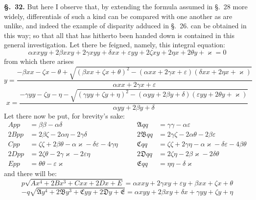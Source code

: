 \documentclass{article}
\begin{document}
\textbf{§.~32.} But here I observe that, by extending the formula assumed in §.~28 more widely,
differentials of such a kind can be compared with one another as are unlike, and indeed the example
of disparity adduced in §.~26. can be obtained in this way; so that all that has hitherto been handed
down is contained in this general investigation. Let there be feigned, namely, this integral
equation:
\[ \alpha xxyy + 2\beta xxy + 2\gamma xyy + \delta xx + \varepsilon yy + 2\zeta xy + 2\eta x + 2\theta y + \varkappa = 0 \tag{1} \]
from which there arises
\[ y = \frac{-\beta xx - \zeta x - \theta + \sqrt{(\beta xx + \zeta x + \theta)^{2} - (\alpha xx + 2\gamma x + \varepsilon)(\delta xx + 2\eta x + \varkappa)}}{\alpha xx + 2\gamma x + \varepsilon} \tag{2} \]
\[ x = \frac{-\gamma yy - \zeta y - \eta - \sqrt{(\gamma yy + \zeta y + \eta)^{2} - (\alpha yy + 2\beta y + \delta)(\varepsilon yy + 2\theta y + \varkappa)}}{\alpha yy + 2\beta y + \delta} \tag{3} \]
Let there now be put, for brevity's sake:
\[ \begin{aligned}
App &= \beta\beta - \alpha\delta &\qquad \mathfrak{A}qq &= \gamma\gamma - \alpha\varepsilon \\
2Bpp &= 2\beta\zeta - 2\alpha\eta - 2\gamma\delta &\qquad 2\mathfrak{B}qq &= 2\gamma\zeta - 2\alpha\theta - 2\beta\varepsilon \\
Cpp &= \zeta\zeta + 2\beta\theta - \alpha\varkappa - \delta\varepsilon - 4\gamma\eta &\qquad \mathfrak{C}qq &= \zeta\zeta + 2\gamma\eta - \alpha\varkappa - \delta\varepsilon - 4\beta\theta \\
2Dpp &= 2\zeta\theta - 2\gamma\varkappa - 2\varepsilon\eta &\qquad 2\mathfrak{D}qq &= 2\zeta\eta - 2\beta\varkappa - 2\delta\theta \\
Epp &= \theta\theta - \varepsilon\varkappa &\qquad \mathfrak{E}qq &= \eta\eta - \delta\varkappa
\end{aligned} \]
and there will be:
\[ p\sqrt{Ax^{4} + 2Bx^{3} + Cxx + 2Dx + E} = \alpha xxy + 2\gamma xy + \varepsilon y + \beta xx + \zeta x + \theta \tag{4} \]
\[ -q\sqrt{\mathfrak{A}y^{4} + 2\mathfrak{B}y^{3} + \mathfrak{C}yy + 2\mathfrak{D}y + \mathfrak{E}} = \alpha xyy + 2\beta xy + \delta x + \gamma yy + \zeta y + \eta \tag{5} \]
\end{document}

